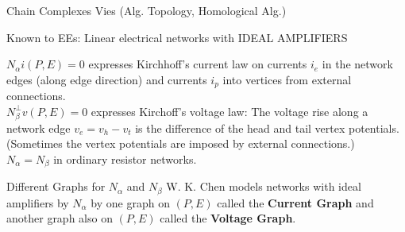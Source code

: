 \documentclass{beamer}
\newcommand{\Reals}{\ensuremath{\mathbb{R}}}
\begin{document}
\newcommand{\COEF}{\Reals}

\begin{frame}{Chain Complexes Vies (Alg. Topology, Homological Alg.)}

\end{frame}





\begin{frame}{Known to EEs: Linear electrical networks with IDEAL AMPLIFIERS}

  $N_\alpha i(P,E)=0$  expresses Kirchhoff's current law on currents $i_e$ in the network edges (along edge direction)
  and currents $i_p$ into vertices from external connections.\\[.1in]
  $N_\beta^\perp v(P,E)=0$ expresses Kirchoff's voltage law: The voltage rise along a network edge 
  $v_e=v_h-v_t$ is the difference of the head and tail vertex potentials.  (Sometimes the vertex potentials are
  imposed by external connections.)\\[0.1in]
  $N_\alpha=N_\beta$ in ordinary resistor networks.

  \begin{block}{Different Graphs for $N_\alpha$ and $N_\beta$}
    W. K. Chen models networks with ideal amplifiers by $N_\alpha$ by one graph on $(P,E)$ called the
    \textbf{Current Graph} and another graph also on $(P,E)$ called the \textbf{Voltage Graph}.
  \end{block}

\end{frame}
    
\end{document}
